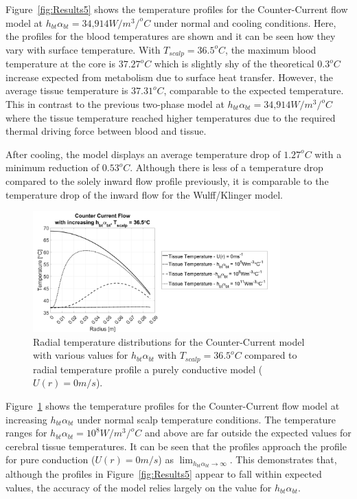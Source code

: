 \documentclass[11pt,english,a4paper,twoside,openright]{report}
\begin{document}
{{{{{{{{Figure~\ref{fig:Results5} shows the temperature profiles for the Counter-Current flow model at $h_{bt}\alpha_{bt} = \text{34,914}W/m^{3}/^{o}C$ under normal and cooling conditions. Here, the profiles for the blood temperatures are shown and it can be seen how they vary with surface temperature. With $T_{scalp} = 36.5^{o}C$, the maximum blood temperature at the core is $37.27^{o}C$ which is slightly shy of the theoretical $0.3^{o}C$ increase expected from metabolism due to surface heat transfer. However, the average tissue temperature is $37.31^{o}C$, comparable to the expected temperature. This in contrast to the previous two-phase model at $h_{bt}\alpha_{bt} = \text{34,914}W/m^{3}/^{o}C$ where the tissue temperature reached higher temperatures due to the required thermal driving force between blood and tissue.

After cooling, the model displays an average temperature drop of $1.27^{o}C$ with a minimum reduction of $0.53^{o}C$. Although there is less of a temperature drop compared to the solely inward flow profile previously, it is comparable to the temperature drop of the inward flow for the Wulff/Klinger model.  

\begin{figure}[h]
	\centering
	\includegraphics[width=0.85\textwidth]{1DHemisphere/figure12}
	\caption[Radial temperature distributions for the Counter-Current model with various values for $h_{bt}\alpha_{bt}$ with $T_{scalp}=36.5^{o}C$ compared to radial temperature profile a purely conductive model]{Radial temperature distributions for the Counter-Current model with various values for $h_{bt}\alpha_{bt}$ with $T_{scalp}=36.5^{o}C$ compared to radial temperature profile a purely conductive model ($U(r)=0m/s$).}
	\label{fig:Results6}
\end{figure}

Figure~\ref{fig:Results6} shows the temperature profiles for the Counter-Current flow model at increasing $h_{bt}\alpha_{bt}$ under normal scalp temperature conditions. The temperature ranges for $h_{bt}\alpha_{bt} = 10^{8}W/m^{3}/^{o}C$ and above are far outside the expected values for cerebral tissue temperatures. It can be seen that the profiles approach the profile for pure conduction ($U(r) = 0m/s$) as $\lim_{h_{bt}\alpha_{bt}\to\infty}$. This demonstrates that, although the profiles in Figure~\ref{fig:Results5} appear to fall within expected values, the accuracy of the model relies largely on the value for $h_{bt}\alpha_{bt}$.

}}}}}}}}
\end{document}

